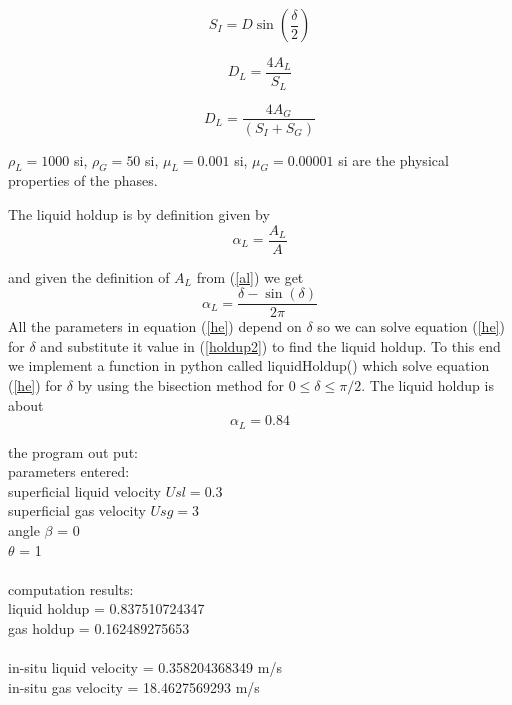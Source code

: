 \documentclass[10pt,a4paper]{report}
\begin{document}
\begin{equation}
S_{I} = D\sin\left(\frac{\delta}{2}   \right) \nonumber
\end{equation}

\begin{equation}
D_{L} = \frac{4A_{L}}{S_{L}} \nonumber
\end{equation}

\begin{equation}
D_{L} = \frac{4A_{G}}{(S_{I}+S_{G})}\nonumber
\end{equation}

$\rho_{L} = 1000$ si, $\rho_{G} = 50$ si, $\mu_{L} = 0.001$ si, $\mu_{G} = 0.00001$ si are the physical properties of the phases.

The liquid holdup is by definition given by
\begin{equation}\label{holup}
\alpha_{L} = \frac{A_{L}}{A}
\end{equation}

and given the definition of $A_{L}$ from (\ref{al}) we get 
\begin{equation}\label{holdup2}
\alpha_{L} = \frac{\delta-\sin(\delta)}{2\pi}
\end{equation}
All the parameters in equation (\ref{he}) depend on $\delta$ so we can solve equation (\ref{he}) for $\delta$ and substitute it value in (\ref{holdup2}) to find the liquid holdup. To this end we implement a function in python called liquidHoldup() which solve equation (\ref{he}) for $\delta$ by using the bisection method for $0\leq \delta\leq \pi/2$. The liquid holdup is about
\begin{equation}
\alpha_{L} = 0.84 \nonumber
\end{equation}

the program out put:\\
parameters entered:\\
superficial liquid velocity $Usl =  0.3$\\
superficial gas velocity $Usg    =  3$\\
angle $\beta$                      =  0\\
$\theta$                           =  1\\
\\
computation results:\\
liquid holdup             = 0.837510724347\\
gas holdup                = 0.162489275653\\
\\
in-situ liquid velocity   = 0.358204368349 m/s\\
in-situ gas velocity      = 18.4627569293 m/s\\
\end{document}

